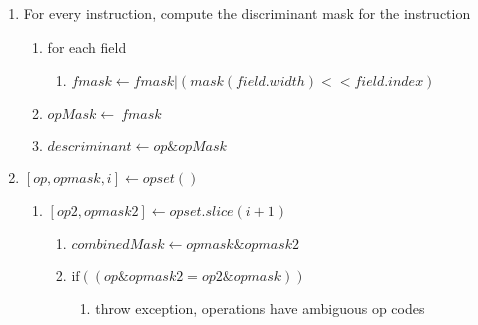 \begin{enumerate}
    \item For every instruction, compute the discriminant mask for the instruction
    \begin{enumerate}
        \item for each field
        \begin{enumerate}
            \item $fmask \leftarrow fmask | (mask(field.width) << field.index)$
        \end{enumerate}
        \item $opMask \leftarrow ~fmask$
        \item $descriminant \leftarrow op \text{\&} opMask$
    \end{enumerate}
    \item $[op, opmask, i] \leftarrow opset()$
    \begin{enumerate}
        \item $[op2, opmask2] \leftarrow opset.slice(i+1)$
        \begin{enumerate}
            \item $combinedMask \leftarrow opmask \text{\&} opmask2 $
            \item $\text{if} ((op \text{\&} opmask2 = op2 \text{\&} opmask))$
            \begin{enumerate}
                \item throw exception, operations have ambiguous op codes
            \end{enumerate}
        \end{enumerate}
    \end{enumerate}
\end{enumerate}

